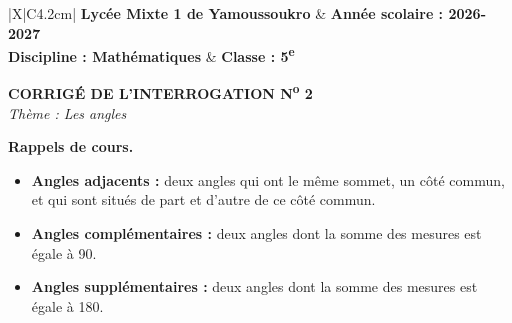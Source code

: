 \documentclass[12pt,a4paper]{article}
\begin{document}
\begin{center}
\begin{tabularx}{\textwidth}{|X|C{4.2cm}|}
\hline
\textbf{Lycée Mixte 1 de Yamoussoukro} & \textbf{Année scolaire : 2026-2027} \\
\textbf{Discipline : Mathématiques} & \textbf{Classe : 5\textsuperscript{e}} \\
\hline
\end{tabularx}
\end{center}

\vspace{0.3cm}
\begin{center}
{\Large\bfseries CORRIGÉ DE L'INTERROGATION N\textsuperscript{o} 2}\\[2pt]
{\large \textit{Thème : Les angles}}
\end{center}

\vspace{0.2cm}
\textbf{Rappels de cours.}
\begin{itemize}
  \item \textbf{Angles adjacents :} deux angles qui ont le même sommet, un côté commun, et qui
        sont situés de part et d'autre de ce côté commun.
  \item \textbf{Angles complémentaires :} deux angles dont la somme des mesures est égale à 90\degres.
  \item \textbf{Angles supplémentaires :} deux angles dont la somme des mesures est égale à 180\degres.
\end{itemize}

\vspace{0.3cm}
\end{document}
